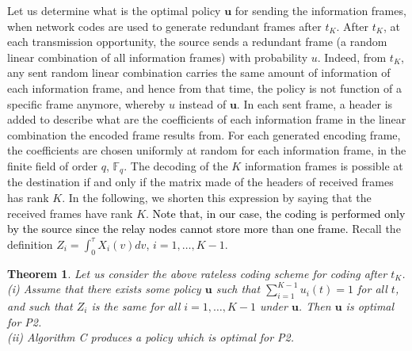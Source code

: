 \documentclass[10pt,twocolumn,conference,final]{IEEEtran}
\newtheorem{thm}{Theorem}[section]
\begin{document}
Let us determine what is the optimal policy $\mathbf{u}$ for sending the information frames, when network codes are used to generate redundant frames after $t_K$. After $t_K$, at each transmission opportunity, the source sends a redundant frame (a random linear combination of all information frames) with probability $u$. Indeed, from $t_K$, any sent random linear combination carries the same amount of information of each information frame, and hence from that time, the policy is not function of a specific frame anymore, whereby $u$ instead of $\mathbf{u}$. In each sent frame, a header is added to describe what are the coefficients of each information frame in the linear combination the encoded frame results from. For each generated encoding frame, the coefficients are chosen uniformly at random for each information frame, in the finite field of order $q$, $\mathbb{F}_q$. The decoding of the $K$ information frames is possible at the destination if and only if the matrix made of the headers of received frames has rank $K$. In the following, we shorten this expression by saying that the received frames have rank $K$. \textcolor{black}{Note that, in our case, the coding is performed only by the source since the relay nodes cannot store more than one frame.}
Recall the definition $Z_i = \int_0^\tau X_i(v)dv $,
$i=1,\dots,K-1$.
\begin{thm}\label{THafterTK}
Let us consider the above rateless coding scheme for coding after $t_K$.\\
(i) Assume that there exists some policy $\mathbf{u}$ such that
$ \sum_{i=1}^{K-1} u_i(t)=1$ for all $t$, and such that
$ Z_i $ is the same for all $i=1,\dots,K-1$ under $\mathbf{u}$. Then $\mathbf{u}$ is optimal for P2.\\
(ii) Algorithm C produces a policy which is optimal for P2.
\end{thm}
\end{document}
